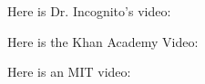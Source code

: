 \documentclass{ximera}
\begin{document}
Here is Dr. Incognito's video:
\begin{expandable}
\begin{center}
\end{center}
\end{expandable}

Here is the Khan Academy Video:
\begin{expandable}
\begin{center}
\end{center}
\end{expandable}

Here is an MIT video:
\begin{expandable}
\begin{center}
\end{center}
\end{expandable}
\end{document}
